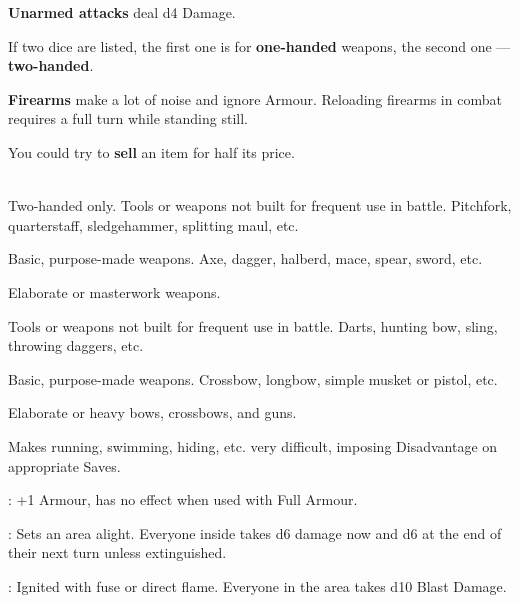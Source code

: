 \documentclass[itdr]{subfiles}
\begin{document}
\textbf{Unarmed attacks} deal d4 Damage.

If two dice are listed, the first one is for \textbf{one-handed} weapons, the second one --- \textbf{two-handed}.

\textbf{Firearms} make a lot of noise and ignore Armour. Reloading firearms in combat requires a full turn while standing still.

You could try to \textbf{sell} an item for half its price.



\\Two-handed only. Tools or weapons not built for frequent use in battle. Pitchfork, quarterstaff, sledgehammer, splitting maul, etc.

 Basic, purpose-made weapons. Axe, dagger, halberd, mace, spear, sword, etc.

 Elaborate or masterwork weapons.



 Tools or weapons not built for frequent use in battle. Darts, hunting bow, sling, throwing daggers, etc.

 Basic, purpose-made weapons. Crossbow, longbow, simple musket or pistol, etc.

 Elaborate or heavy bows, crossbows, and guns.




 Makes running, swimming, hiding, etc. very difficult, imposing Disadvantage on appropriate Saves.

: +1 Armour, has no effect when used with Full Armour.



: Sets an area alight. Everyone inside takes d6 damage now and d6 at the end of their next turn unless extinguished.

: Ignited with fuse or direct flame. Everyone in the area takes d10 Blast Damage.
\end{document}
